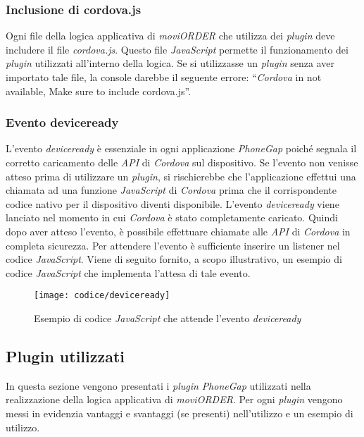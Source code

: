 \subsubsection{Inclusione di cordova.js}

Ogni file della logica applicativa di \textit{moviORDER} che utilizza dei \textit{plugin} deve includere il file \textit{cordova.js}. Questo file \textit{JavaScript} permette il funzionamento dei \textit{plugin} utilizzati all'interno della logica. Se si utilizzasse un \textit{plugin} senza aver importato tale file, la console darebbe il seguente errore: ``\textit{Cordova} in not available, Make sure to include cordova.js''.

\subsubsection{Evento deviceready}

L'evento \textit{deviceready} è essenziale in ogni applicazione \textit{PhoneGap} poiché segnala il corretto caricamento delle \textit{API} di \textit{Cordova} sul dispositivo. Se l'evento non venisse atteso prima di utilizzare un \textit{plugin}, si rischierebbe che l'applicazione effettui una chiamata ad una funzione \textit{JavaScript} di \textit{Cordova} prima che il corrispondente codice nativo per il dispositivo diventi disponibile. L'evento \textit{deviceready} viene lanciato nel momento in cui \textit{Cordova} è stato completamente caricato. Quindi dopo aver atteso l'evento, è possibile effettuare chiamate alle \textit{API} di \textit{Cordova} in completa sicurezza. Per attendere l'evento è sufficiente inserire un listener nel codice \textit{JavaScript}. Viene di seguito fornito, a scopo illustrativo, un esempio di codice \textit{JavaScript} che implementa l'attesa di tale evento.

\begin{figure}[!h] 
    \centering 
    \texttt{[image: codice/deviceready]} 
    \caption{Esempio di codice \textit{JavaScript} che attende l'evento \textit{deviceready}}
\end{figure}

\subsection{Plugin utilizzati}

In questa sezione vengono presentati i \textit{plugin} \textit{PhoneGap} utilizzati nella realizzazione della logica applicativa di \textit{moviORDER}. Per ogni \textit{plugin} vengono messi in evidenzia vantaggi e svantaggi (se presenti) nell'utilizzo e un esempio di utilizzo.

